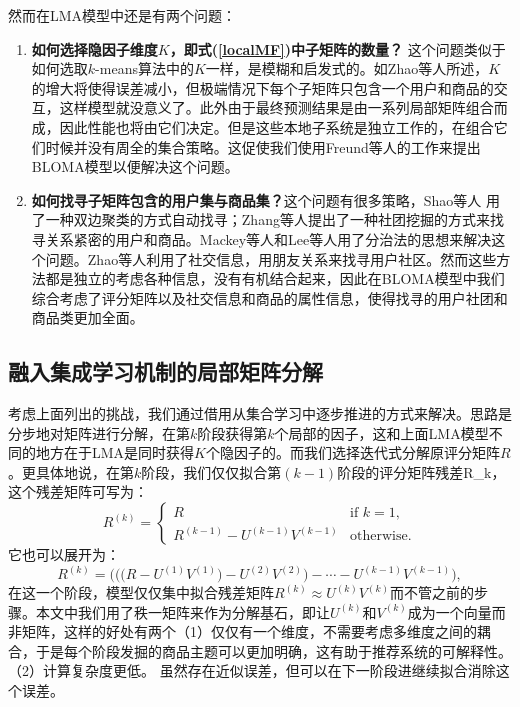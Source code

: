 然而在LMA模型中还是有两个问题：
\begin{enumerate}
\vspace{1.5mm}
\item \textbf{如何选择隐因子维度$K$，即式(\ref{localMF})中子矩阵的数量？} 这个问题类似于如何选取$k$-means算法中的$K$一样，是模糊和启发式的。如Zhao等人所述，$K$的增大将使得误差减小，但极端情况下每个子矩阵只包含一个用户和商品的交互，这样模型就没意义了。此外由于最终预测结果是由一系列局部矩阵组合而成，因此性能也将由它们决定。但是这些本地子系统是独立工作的，在组合它们时候并没有周全的集合策略。这促使我们使用Freund等人的工作来提出BLOMA模型以便解决这个问题。

\vspace{1.5mm}
\item \textbf{如何找寻子矩阵包含的用户集与商品集？}这个问题有很多策略，Shao等人 用了一种双边聚类的方式自动找寻；Zhang等人提出了一种社团挖掘的方式来找寻关系紧密的用户和商品。Mackey等人和Lee等人用了分治法的思想来解决这个问题。Zhao等人利用了社交信息，用朋友关系来找寻用户社区。然而这些方法都是独立的考虑各种信息，没有有机结合起来，因此在BLOMA模型中我们综合考虑了评分矩阵以及社交信息和商品的属性信息，使得找寻的用户社团和商品类更加全面。
\end{enumerate}

\subsection{融入集成学习机制的局部矩阵分解}
考虑上面列出的挑战，我们通过借用从集合学习中逐步推进的方式来解决。思路是分步地对矩阵进行分解，在第$k$阶段获得第$k$个局部的因子，这和上面LMA模型不同的地方在于LMA是同时获得$K$个隐因子的。而我们选择迭代式分解原评分矩阵$R$。更具体地说，在第$k$阶段，我们仅仅拟合第$(k-1)$阶段的评分矩阵残差\gls{R_k}，这个残差矩阵可写为：
\begin{equation}
\label{residue}
R^{(k)} = 
\begin{cases}
R& \text{if } k=1,\\
R^{(k-1)}-U^{(k-1)}V^{(k-1)}& \text{otherwise}.
\end{cases}
\end{equation}
它也可以展开为：
\begin{equation}
\label{unfold}
R^{(k)} = \bigg(\Big(\big(R-U^{(1)}V^{(1)}\big) - U^{(2)}V^{(2)} \Big)-\cdots-U^{(k-1)}V^{(k-1)}\bigg),
\end{equation}
在这一个阶段，模型仅仅集中拟合残差矩阵$R^{(k)} \approx U^{(k)}V^{(k)}$而不管之前的步骤。本文中我们用了秩一矩阵来作为分解基石，即让$U^{(k)}$和$V^{(k)}$成为一个向量而非矩阵，这样的好处有两个（1）仅仅有一个维度，不需要考虑多维度之间的耦合，于是每个阶段发掘的商品主题可以更加明确，这有助于推荐系统的可解释性。
（2）计算复杂度更低。 虽然存在近似误差，但可以在下一阶段进继续拟合消除这个误差。

